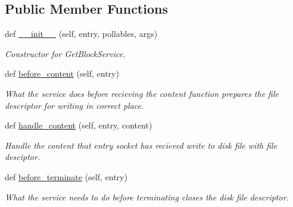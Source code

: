 \subsection*{Public Member Functions}
\begin{DoxyCompactItemize}
\item 
def \hyperlink{class_r_a_i_d5_1_1block__device_1_1services_1_1set__block__service_1_1_set_block_service_a591d47df0e924696ac23450906f5ddf2}{\+\_\+\+\_\+init\+\_\+\+\_\+} (self, entry, pollables, args)
\begin{DoxyCompactList}\small\item\em Constructor for Get\+Block\+Service. \end{DoxyCompactList}\item 
def \hyperlink{class_r_a_i_d5_1_1block__device_1_1services_1_1set__block__service_1_1_set_block_service_a00766fb59a3f4118444ab9265cb9e9d2}{before\+\_\+content} (self, entry)
\begin{DoxyCompactList}\small\item\em What the service does before recieving the content function prepares the file descriptor for writing in correct place. \end{DoxyCompactList}\item 
def \hyperlink{class_r_a_i_d5_1_1block__device_1_1services_1_1set__block__service_1_1_set_block_service_ac79d1b55a4e34943fa1e4f9514d9891d}{handle\+\_\+content} (self, entry, content)
\begin{DoxyCompactList}\small\item\em Handle the content that entry socket has recieved write to disk file with file desciptor. \end{DoxyCompactList}\item 
\mbox{\label{class_r_a_i_d5_1_1block__device_1_1services_1_1set__block__service_1_1_set_block_service_af727ae5baf474b50749faaff9f6f7811}} 
def \hyperlink{class_r_a_i_d5_1_1block__device_1_1services_1_1set__block__service_1_1_set_block_service_af727ae5baf474b50749faaff9f6f7811}{before\+\_\+terminate} (self, entry)
\begin{DoxyCompactList}\small\item\em What the service needs to do before terminating closes the disk file descriptor. \end{DoxyCompactList}\end{DoxyCompactItemize}
